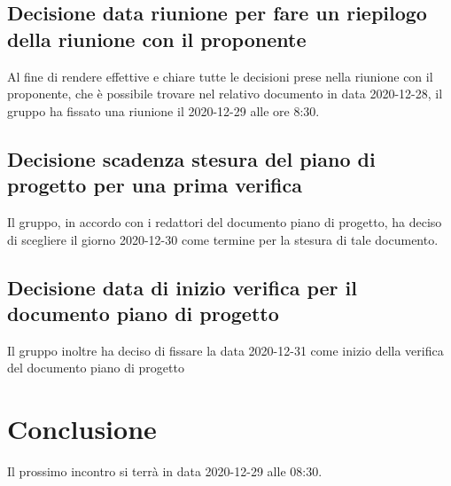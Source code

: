 \subsection{Decisione data riunione per fare un riepilogo della riunione con il proponente}
Al fine di rendere effettive e chiare tutte le decisioni prese nella riunione con il proponente, che è possibile trovare nel relativo documento in data 2020-12-28, il gruppo ha fissato una riunione il 2020-12-29 alle ore 8:30.

\subsection{Decisione scadenza stesura del piano di progetto per una prima verifica}
Il gruppo, in accordo con i redattori del documento piano di progetto, ha deciso di scegliere il giorno 2020-12-30 come termine per la stesura di tale documento.

\subsection{Decisione data di inizio verifica per il documento piano di progetto} 
Il gruppo inoltre ha deciso di fissare la data 2020-12-31 come inizio della verifica del documento piano di progetto

\section{Conclusione}
Il prossimo incontro si terrà in data 2020-12-29 alle 08:30.

